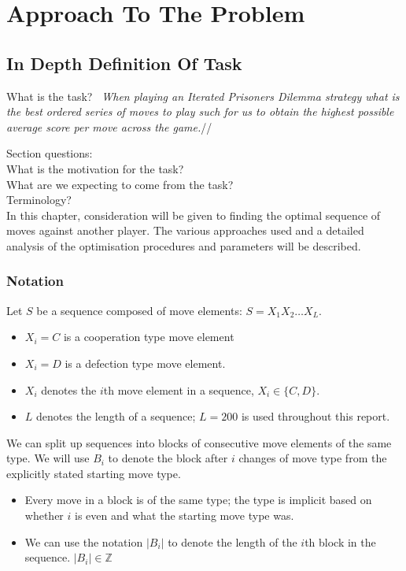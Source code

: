 
\chapter{Approach To The Problem}\label{ch:approach}
\section{In Depth Definition Of Task}\label{sec:inDepthDefinitionOfTask}
What is the task?
{\itshape~When playing an Iterated Prisoners Dilemma strategy what is the best ordered series of moves to play such for us to obtain the highest possible average score per move across the game.}//

Section questions:\\
What is the motivation for the task?\\
What are we expecting to come from the task?\\
Terminology?\\

In this chapter, consideration will be given to finding the optimal sequence of moves against another player. The various approaches used and a detailed analysis of the optimisation procedures and parameters will be described.\\

\subsection{Notation}
Let \(S\) be a sequence composed of move elements: \(S = X_1 X_2 \ldots X_L\).
\begin{itemize}
\item \(X_i=C\) is a cooperation type move element 
\item \(X_i=D\) is a defection type move element.
\item \(X_i\) denotes the \(i\)th move element in a sequence, \(X_i \in \{C,D\}\).
\item \(L\) denotes the length of a sequence; \(L=200\) is used throughout this report.
\end{itemize}

We can split up sequences into blocks of consecutive move elements of the same type.
We will use \(B_i\) to denote the block after \(i\) changes of move type from the explicitly stated starting move type.
\begin{itemize}
\item Every move in a block is of the same type; the type is implicit based on whether \(i\) is even and what the starting move type was.
\item We can use the notation \(|B_i|\) to denote the length of the \(i\)th block in the sequence. \(|B_i| \in \mathbb{Z}\)
\end{itemize}

